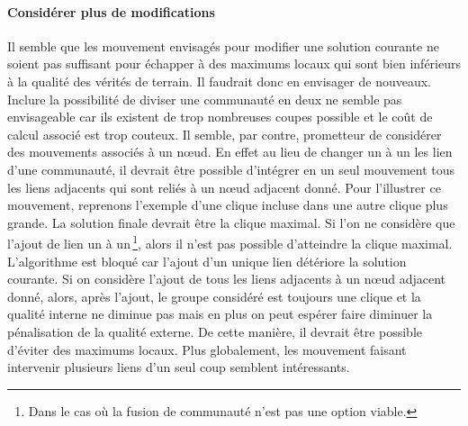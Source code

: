 \paragraph{Considérer plus de modifications}
Il semble que les mouvement envisagés pour modifier une solution courante ne soient pas suffisant pour échapper à des maximums locaux qui sont bien inférieurs à la qualité des vérités de terrain.
Il faudrait donc en envisager de nouveaux.
Inclure la possibilité de diviser une communauté en deux ne semble pas envisageable car ils existent de trop nombreuses coupes possible et le coût de calcul associé est trop couteux.
Il semble, par contre, prometteur de considérer des mouvements associés à un n\oe ud.
En effet au lieu de changer un à un les lien d'une communauté, il devrait être possible d'intégrer en un seul mouvement tous les liens adjacents qui sont reliés à un n\oe ud adjacent donné.
Pour l'illustrer ce mouvement, reprenons l'exemple d'une clique incluse dans une autre clique plus grande.
La solution finale devrait être la clique maximal.
Si l'on ne considère que l'ajout de lien un à un\,\footnote{Dans le cas où la fusion de communauté n'est pas une option viable.}, alors il n'est pas possible d'atteindre la clique maximal.
L'algorithme est bloqué car l'ajout d'un unique lien détériore la solution courante.
Si on considère l'ajout de tous les liens adjacents à un n\oe ud adjacent donné, alors, après l'ajout, le groupe considéré est toujours une clique et la qualité interne ne diminue pas mais en plus on peut espérer faire diminuer la pénalisation de la qualité externe.
De cette manière, il devrait être possible d'éviter des maximums locaux.
Plus globalement, les mouvement faisant intervenir plusieurs liens d'un seul coup semblent intéressants.



